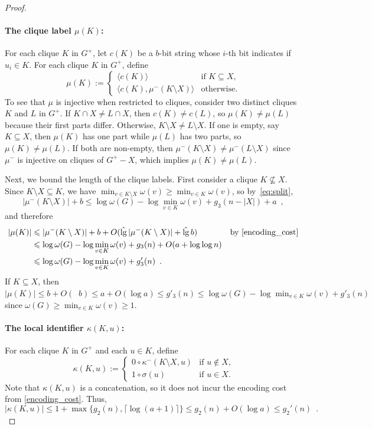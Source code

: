 \documentclass{patmorin}
\let\eqref\cref
\renewcommand{\ge}{\geqslant}
\renewcommand{\le}{\leqslant}
\renewcommand{\leq}{\leqslant}
\DeclareMathOperator{\lgg}{\hat{lg}}
\newcommand{\Oh}{O}
\begin{document}
\begin{proof}
  \paragraph{\boldmath The clique label $\mu(K)$:}
  For each clique $K$ in $G^+$, let $c(K)$ be a $b$-bit string whose $i$-th bit indicates if $u_i\in K$.
  For each clique $K$ in $G^+$, define
  \[
    \mu(K):=
    \begin{cases}
      \langle c(K) \rangle           & \text{if $K\subseteq X$,} \\
      \langle c(K),\mu^-(K\setminus X)\rangle & \text{otherwise.}
    \end{cases}
  \]
  To see that $\mu$ is injective when restricted to cliques, consider two distinct cliques $K$ and $L$ in $G^+$. If $K\cap X \neq L\cap X$, then $c(K)\neq c(L)$, so $\mu(K)\neq \mu(L)$ because their first parts differ. Otherwise, $K\setminus X \neq L\setminus X$. If one is empty, say $K\subseteq X$, then $\mu(K)$ has one part while $\mu(L)$ has two parts, so $\mu(K)\neq\mu(L)$. If both are non-empty, then $\mu^-(K\setminus X)\neq \mu^-(L\setminus X)$ since $\mu^-$ is injective on cliques of $G^+-X$, which implies $\mu(K)\neq \mu(L)$.

  Next, we bound the length of the clique labels. First consider a clique $K\not\subseteq X$. Since $K\setminus X \subseteq K$, we have $\min_{v\in K\setminus X}\omega(v) \ge \min_{v\in K}\omega(v)$, so by~\eqref{eq:split},
  \[
    |\mu^-(K\setminus X)| + b
    \leq \log\omega(G)-\log\min_{v\in K}\omega(v) + g_3(n-|X|)+a \enspace,
  \]
  and therefore
  \begin{align*}
    |\mu(K)|
     & \leq |\mu^-(K\setminus X)|+b + \Oh(\lgg|\mu^-(K\setminus X)|+\lgg b)
     & \text{by \eqref{encoding_cost}}                                                               \\
     & \leq \log\omega(G)-\log\min_{v\in K}\omega(v) + g_3(n) + \Oh(a+\log\log n) \\
     & \leq \log\omega(G)-\log\min_{v\in K}\omega(v) + g'_3(n) \enspace .
  \end{align*}
  If $K\subseteq X$, then $|\mu(K)| \le b + \Oh(\lgg b) \le a + \Oh(\log a) \le g'_3(n) \le \log\omega(G)-\log\min_{v\in K}\omega(v) + g'_3(n)$ since $\omega(G) \ge \min_{v\in K}\omega(v) \ge 1$.

  \paragraph{\boldmath The local identifier $\kappa(K,u)$:}
  For each clique $K$ in $G^+$ and each $u\in K$, define
  \[
    \kappa(K,u) :=
    \begin{cases}
      0 \circ \kappa^-(K\setminus X,u) & \text{if $u\not\in X$,} \\
      1 \circ \sigma(u)                & \text{if $u\in X$.}
    \end{cases}
  \]
  Note that $\kappa(K,u)$ is a concatenation, so it does not incur the encoding cost from \eqref{encoding_cost}. Thus,
  \[
    |\kappa(K,u)|\le 1+ \max\{g_2(n), \lceil\log(a+1)\rceil\} \le g_2(n)+\Oh(\log a) \le g_2'(n) \enspace.
  \]


\end{proof}
\end{document}
